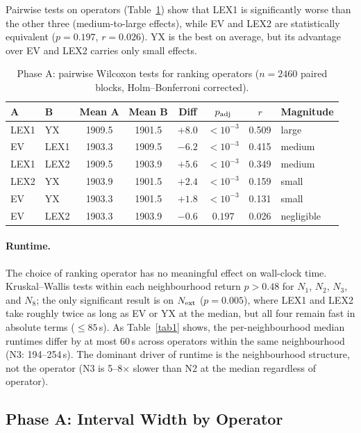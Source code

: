 \documentclass[preprint,12pt]{elsarticle}
\begin{document}
Pairwise tests on operators (Table~\ref{tab2}) show that LEX1 is significantly worse than the other three (medium-to-large effects), while EV and LEX2 are statistically equivalent ($p = 0.197$, $r = 0.026$). YX is the best on average, but its advantage over EV and LEX2 carries only small effects.

\begin{table}[t]
\centering
\caption{Phase A: pairwise Wilcoxon tests for ranking operators ($n = 2460$ paired blocks, Holm--Bonferroni corrected).}
\label{tab2}
\begin{tabular}{l l c c c c c l}
\hline
A & B & Mean A & Mean B & Diff & $p_{\rm adj}$ & $r$ & Magnitude \\
\hline
LEX1 & YX   & 1909.5 & 1901.5 & $+8.0$ & $<10^{-3}$ & 0.509 & large \\
EV   & LEX1 & 1903.3 & 1909.5 & $-6.2$ & $<10^{-3}$ & 0.415 & medium \\
LEX1 & LEX2 & 1909.5 & 1903.9 & $+5.6$ & $<10^{-3}$ & 0.349 & medium \\
LEX2 & YX   & 1903.9 & 1901.5 & $+2.4$ & $<10^{-3}$ & 0.159 & small \\
EV   & YX   & 1903.3 & 1901.5 & $+1.8$ & $<10^{-3}$ & 0.131 & small \\
EV   & LEX2 & 1903.3 & 1903.9 & $-0.6$ & $0.197$    & 0.026 & negligible \\
\hline
\end{tabular}
\end{table}

\paragraph{Runtime.} The choice of ranking operator has no meaningful effect on wall-clock time. Kruskal--Wallis tests within each neighbourhood return $p > 0.48$ for $N_1$, $N_2$, $N_3$, and $N_8$; the only significant result is on $N_{\rm ext}$ ($p = 0.005$), where LEX1 and LEX2 take roughly twice as long as EV or YX at the median, but all four remain fast in absolute terms ($\leq 85$\,s). As Table~\ref{tab1} shows, the per-neighbourhood median runtimes differ by at most 60\,s across operators within the same neighbourhood (N3: 194--254\,s). The dominant driver of runtime is the neighbourhood structure, not the operator (N3 is 5--8$\times$ slower than N2 at the median regardless of operator).

\subsection{Phase A: Interval Width by Operator}
\label{sec6.3}
\end{document}
